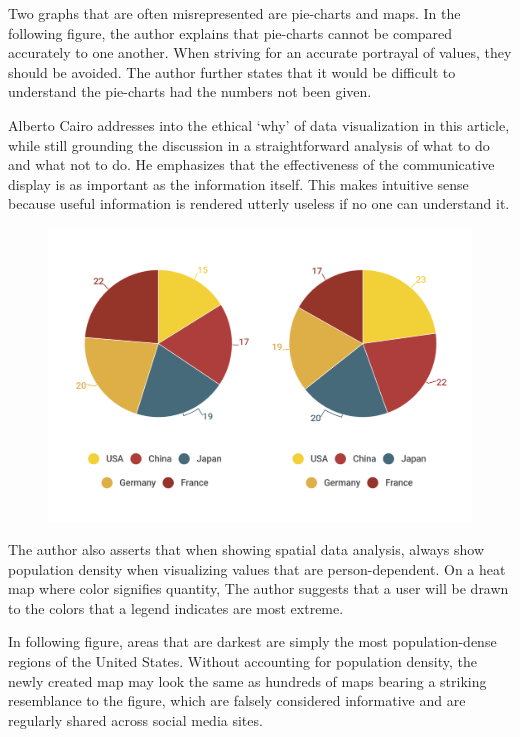 \documentclass[]{book}
\theoremstyle{definition}
\theoremstyle{definition}
\theoremstyle{definition}
\theoremstyle{remark}
\begin{document}
Two graphs that are often misrepresented are pie-charts and maps. In the
following figure, the author explains that pie-charts cannot be compared
accurately to one another. When striving for an accurate portrayal of
values, they should be avoided. The author further states that it would
be difficult to understand the pie-charts had the numbers not been
given.

Alberto Cairo addresses into the ethical `why' of data visualization in
this article, while still grounding the discussion in a straightforward
analysis of what to do and what not to do. He emphasizes that the
effectiveness of the communicative display is as important as the
information itself. This makes intuitive sense because useful
information is rendered utterly useless if no one can understand it.

\begin{figure}
\centering
\includegraphics{images/PieCharts.png}
\caption{}
\end{figure}

The author also asserts that when showing spatial data analysis, always
show population density when visualizing values that are
person-dependent. On a heat map where color signifies quantity, The
author suggests that a user will be drawn to the colors that a legend
indicates are most extreme.

In following figure, areas that are darkest are simply the most
population-dense regions of the United States. Without accounting for
population density, the newly created map may look the same as hundreds
of maps bearing a striking resemblance to the figure, which are falsely
considered informative and are regularly shared across social media
sites.
\end{document}
